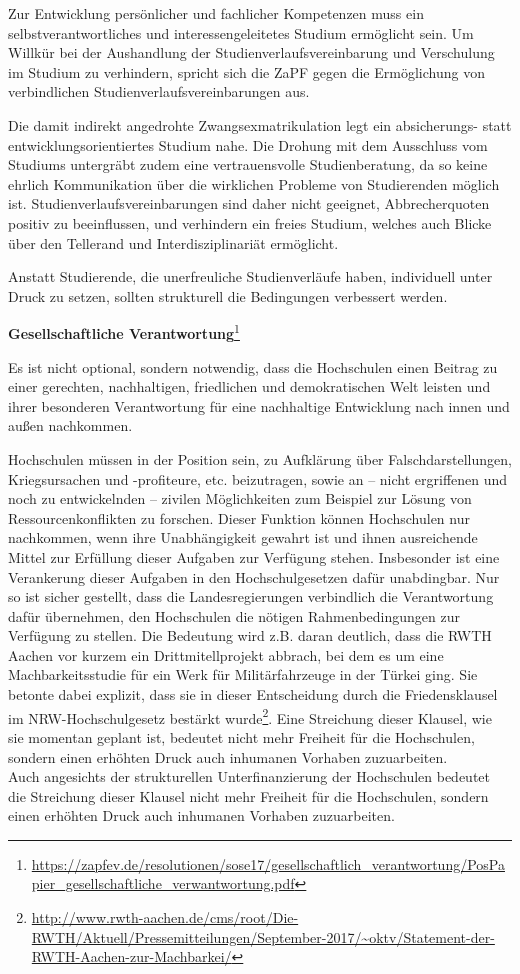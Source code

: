 Zur Entwicklung persönlicher und fachlicher Kompetenzen muss ein selbstverantwortliches und interessengeleitetes Studium ermöglicht sein. Um Willkür bei der Aushandlung der Studienverlaufsvereinbarung und Verschulung im Studium zu verhindern, spricht sich die ZaPF gegen die Ermöglichung von verbindlichen Studienverlaufsvereinbarungen aus.

Die damit indirekt angedrohte Zwangsexmatrikulation legt ein absicherungs- statt entwicklungsorientiertes Studium nahe. Die Drohung mit dem Ausschluss vom Studiums untergräbt zudem eine vertrauensvolle Studienberatung, da so keine ehrlich Kommunikation über die wirklichen Probleme von Studierenden möglich ist. Studienverlaufsvereinbarungen sind daher nicht geeignet, Abbrecherquoten positiv zu beeinflussen, und verhindern ein freies Studium, welches auch Blicke über den Tellerand und Interdisziplinariät ermöglicht.

Anstatt Studierende, die unerfreuliche Studienverläufe haben, individuell unter Druck zu setzen, sollten strukturell die Bedingungen verbessert werden.

\textbf{Gesellschaftliche Verantwortung}\footnote{\url{https://zapfev.de/resolutionen/sose17/gesellschaftlich_verantwortung/PosPapier_gesellschaftliche_verwantwortung.pdf}}

Es ist nicht optional, sondern notwendig, dass die Hochschulen einen Beitrag zu einer gerechten, nachhaltigen, friedlichen und demokratischen Welt leisten und ihrer besonderen Verantwortung für eine nachhaltige Entwicklung nach innen und außen nachkommen.

Hochschulen müssen in der Position sein, zu Aufklärung über Falschdarstellungen, Kriegsursachen und -profiteure, etc. beizutragen, sowie an – nicht ergriffenen und noch zu entwickelnden – zivilen Möglichkeiten zum Beispiel zur Lösung von Ressourcenkonflikten zu forschen. Dieser Funktion können Hochschulen nur nachkommen, wenn ihre Unabhängigkeit gewahrt ist und ihnen ausreichende Mittel zur Erfüllung dieser Aufgaben zur Verfügung stehen.
Insbesonder ist eine Verankerung dieser Aufgaben in den Hochschulgesetzen dafür unabdingbar. Nur so ist sicher gestellt, dass die Landesregierungen verbindlich die Verantwortung dafür übernehmen, den Hochschulen die nötigen Rahmenbedingungen zur Verfügung zu stellen.
Die Bedeutung wird z.B. daran deutlich, dass die RWTH Aachen vor kurzem ein Drittmitellprojekt abbrach, bei dem es um eine Machbarkeitsstudie für ein Werk für Militärfahrzeuge in der Türkei ging. Sie betonte dabei explizit, dass sie in dieser Entscheidung durch die Friedensklausel im NRW-Hochschulgesetz bestärkt wurde\footnote{\url{http://www.rwth-aachen.de/cms/root/Die-RWTH/Aktuell/Pressemitteilungen/September-2017/~oktv/Statement-der-RWTH-Aachen-zur-Machbarkei/}}. Eine Streichung dieser Klausel, wie sie momentan geplant ist, bedeutet nicht mehr Freiheit für die Hochschulen, sondern einen erhöhten Druck auch inhumanen Vorhaben zuzuarbeiten.\\
Auch angesichts der strukturellen Unterfinanzierung der Hochschulen bedeutet die Streichung dieser Klausel nicht mehr Freiheit für die Hochschulen, sondern einen erhöhten Druck auch inhumanen Vorhaben zuzuarbeiten.
